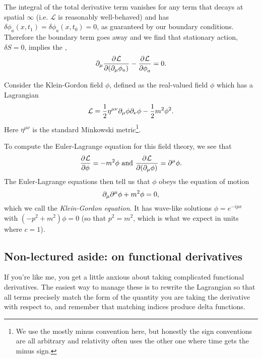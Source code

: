 The integral of the total derivative term vanishes for any term that decays at spatial $\infty$ (i.e. $\mathcal{L}$ is reasonably well-behaved) and has $\delta \phi_a(x,t_1)=\delta \phi_a(x,t_0)=0$, as guaranteed by our boundary conditions. Therefore the boundary term goes away and we find that stationary action, $\delta S=0$, implies the ,
\begin{equation}
\partial_\mu\frac{\partial^{} \mathcal{L}}{\partial (\partial_\mu\phi_a) ^{}}-\frac{\partial^{} \mathcal{L}}{\partial \phi_a ^{}}=0.
\end{equation}

\begin{exm}
Consider the Klein-Gordon field $\phi$, defined as the real-valued field $\phi$ which has a Lagrangian
\begin{equation}
\mathcal{L}=\frac{1}{2} \eta^{\mu\nu}\partial_\mu \phi \partial_\nu \phi -\frac{1}{2}m^2 \phi^2.
\end{equation}
Here $\eta^{\mu\nu}$ is the standard Minkowski metric\footnote{We use the mostly minus convention here, but honestly the sign conventions are all arbitrary and relativity often uses the other one where time gets the minus sign.}.

To compute the Euler-Lagrange equation for this field theory,
 we see that $$\frac{\partial^{} \mathcal L}{\partial \phi ^{}}=-m^2\phi \text{ and } \frac{\partial^{} \mathcal L}{\partial (\partial_\mu \phi) ^{}}=\partial^\mu \phi.$$
The Euler-Lagrange equations then tell us that $\phi$ obeys the equation of motion $$\partial_\mu \partial^\mu \phi+m^2\phi = 0,$$ which we call the \emph{Klein-Gordon equation}. It has wave-like solutions $\phi=e^{-ipx}$ with $(-p^2+m^2)\phi=0$ (so that $p^2=m^2$, which is what we expect in units where $c=1$).
\end{exm}

\subsection*{Non-lectured aside: on functional derivatives} If you're like me, you get a little anxious about taking complicated functional derivatives. The easiest way to manage these is to rewrite the Lagrangian so that all terms precisely match the form of the quantity you are taking the derivative with respect to, and remember that matching indices produce delta functions. 

